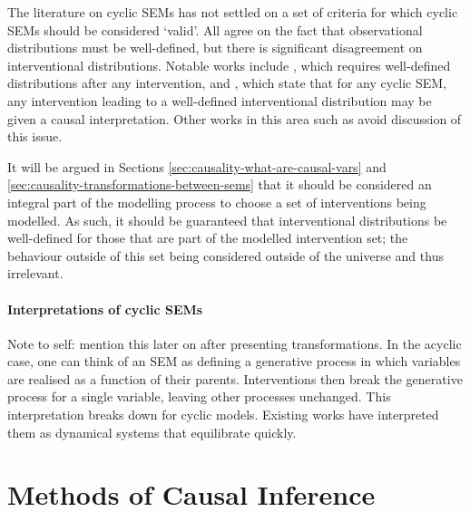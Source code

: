 
The literature on cyclic SEMs has not settled on a set of criteria for which cyclic SEMs should be considered `valid'. 
All agree on the fact that observational distributions must be well-defined, but there is significant disagreement on interventional distributions.
Notable works include \cite{hyttinen2010causal}, which requires well-defined distributions after any intervention, and \cite{mooij2011causal}, which state that for any cyclic SEM, any intervention leading to a well-defined interventional distribution may be given a causal interpretation. Other works in this area such as \cite{lacerda2012discovering} avoid discussion of this issue.

It will be argued in Sections \ref{sec:causality-what-are-causal-vars} and \ref{sec:causality-transformations-between-sems} that it should be considered an integral part of the modelling process to choose a set of interventions being modelled. As such, it should be guaranteed that interventional distributions be well-defined for those that are part of the modelled intervention set; the behaviour outside of this set being considered outside of the universe and thus irrelevant.

\paragraph{Interpretations of cyclic SEMs}
Note to self: mention this later on after presenting transformations.
In the acyclic case, one can think of an SEM as defining a generative process in which variables are realised as a function of their parents. Interventions then break the generative process for a single variable, leaving other processes unchanged.
This interpretation breaks down for cyclic models. Existing works have interpreted them as dynamical systems that equilibrate quickly. 

\section{Methods of Causal Inference}

